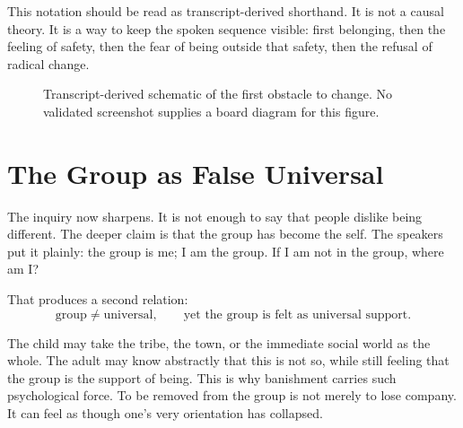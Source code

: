 This notation should be read as transcript-derived shorthand. It is not a causal theory. It is a way to keep the spoken sequence visible: first belonging, then the feeling of safety, then the fear of being outside that safety, then the refusal of radical change.

\begin{figure}
\centering
{}

Transcript-derived schematic of the first obstacle to change. No validated screenshot supplies a board diagram for this figure.
\end{figure}

\section{The Group as False Universal}

The inquiry now sharpens. It is not enough to say that people dislike being different. The deeper claim is that the group has become the self. The speakers put it plainly: the group is me; I am the group. If I am not in the group, where am I?

That produces a second relation:
\begin{equation}
\text{group} \neq \text{universal},
\qquad
\text{yet the group is felt as universal support}.
\end{equation}

The child may take the tribe, the town, or the immediate social world as the whole. The adult may know abstractly that this is not so, while still feeling that the group is the support of being. This is why banishment carries such psychological force. To be removed from the group is not merely to lose company. It can feel as though one's very orientation has collapsed.

